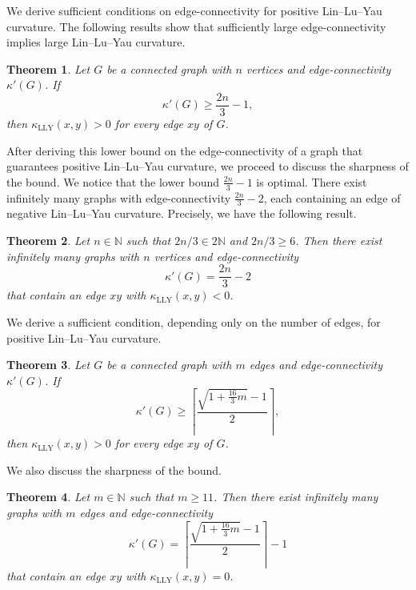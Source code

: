 \documentclass[10pt,a4paper]{article}
\newtheorem{theorem}{Theorem}[section]
\theoremstyle{definition}
\theoremstyle{definition}
\theoremstyle{nonumber}
\begin{document}
We derive sufficient conditions on edge-connectivity for positive Lin--Lu--Yau curvature.
The following results show that sufficiently large edge-connectivity implies large Lin--Lu--Yau curvature.

\begin{theorem}\label{n bound}
Let $G$ be a connected graph with $n$ vertices and edge-connectivity $\kappa'(G)$. If 
$$
\kappa'(G)\ge \frac{2n}{3}-1,
$$ 
then $\kappa_{\mathrm{LLY}}(x,y)>0$ for every edge $xy$ of $G$.
\end{theorem}

After deriving this lower bound on the edge-connectivity of a graph that guarantees positive Lin--Lu--Yau curvature, we proceed to discuss the sharpness of the bound.
We notice that the lower bound $\frac{2n}{3}-1$ is optimal. There exist infinitely many graphs with edge-connectivity $\frac{2n}{3}-2$, each containing an edge of negative Lin--Lu--Yau curvature. Precisely, we have the following result.

\begin{theorem}\label{n bound sharpness}
Let $n \in \mathbb{N}$ such that $2n/3 \in 2\mathbb{N}$ and $2n/3 \geq 6$. Then there exist infinitely many graphs with $n$ vertices and edge-connectivity 
$$
\kappa'(G) = \frac{2n}{3} - 2
$$ 
that contain an edge $xy$ with $\kappa_{\mathrm{LLY}}(x, y) < 0$.
\end{theorem}

We derive a sufficient condition, depending only on the number of edges, for positive Lin--Lu--Yau curvature.

\begin{theorem}\label{m bound}
Let $G$ be a connected graph with $m$ edges and edge-connectivity $\kappa'(G)$. If $$
\kappa'(G)\ge \left\lceil\frac{\sqrt{1+\frac{16}{3}m}-1}{2}
\right\rceil,
$$ 
then $\kappa_{\mathrm{LLY}}(x,y)>0$ for every edge $xy$ of $G$.
\end{theorem}

We also discuss the sharpness of the bound.

\begin{theorem}\label{m bound sharpness}
Let $m \in \mathbb{N}$ such that $m \geq 11$. Then there exist infinitely many graphs with $m$ edges and edge-connectivity 
$$
\kappa'(G)=\left\lceil\frac{\sqrt{1+\frac{16}{3}m}-1}{2}\right\rceil-1
$$ 
that contain an edge $xy$ with $\kappa_{\mathrm{LLY}}(x, y) = 0$.
\end{theorem}
\end{document}
